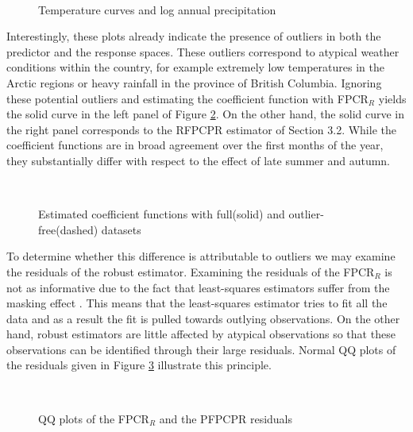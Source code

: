 \documentclass[11pt]{article}
\begin{document}
\begin{figure}[H]
\centering
{} \
\caption{Temperature curves and log annual precipitation}
\label{fig:3}
\end{figure}

Interestingly, these plots already indicate the presence of outliers in both the predictor and the response spaces. These outliers correspond to atypical weather conditions within the country, for example extremely low temperatures in the Arctic regions or heavy rainfall in the province of British Columbia. Ignoring these potential outliers and estimating the coefficient function with FPCR$_R$ yields the solid curve in the left panel of Figure \ref{fig:4}. On the other hand, the solid curve in the right panel corresponds to the RFPCPR estimator of Section 3.2. While the coefficient functions are in broad agreement over the first months of the year, they substantially differ  with respect to the effect of late summer and autumn. 

\begin{figure}[H]
\centering
{} \
\caption{Estimated coefficient functions with full(solid) and outlier-free(dashed) datasets}
\label{fig:4}
\end{figure}

To determine whether this difference is attributable to outliers we may examine the residuals of the robust estimator. Examining the residuals of the FPCR$_R$ is not as informative due to the fact that least-squares estimators suffer from the masking effect \citep{rousseeuw1990unmasking}. This means that the least-squares estimator tries to fit all the data and as a result the fit is pulled towards outlying observations. On the other hand, robust estimators are little affected by atypical observations so that these observations can be identified through their large residuals. Normal QQ plots of the residuals given in Figure \ref{fig:5} illustrate this principle.

\begin{figure}[H]
\centering
\subfloat{\texttt{[image: "QQ1"]}} \
\subfloat{\texttt{[image: "QQ2"]}}
\caption{QQ plots of the FPCR$_R$ and the PFPCPR residuals}
\label{fig:5}
\end{figure}
\end{document}
